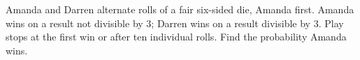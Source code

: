 Amanda and Darren alternate rolls of a fair six-sided die, Amanda first. Amanda wins on a result not divisible by $ 3 $; Darren wins on a result divisible by $ 3 $. Play stops at the first win or after ten individual rolls. Find the probability Amanda wins.

